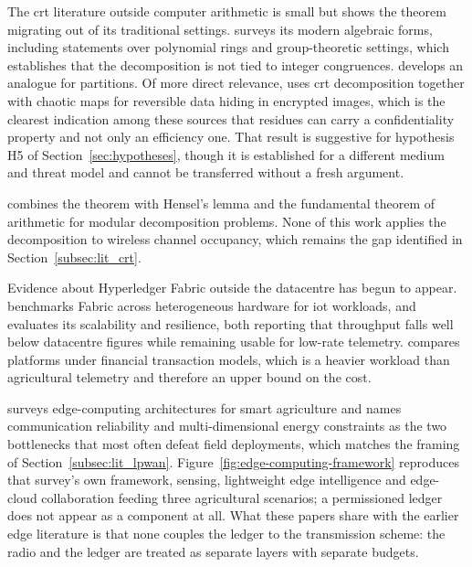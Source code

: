 \label{subsec:lit_crt_extended}

The \gls{crt} literature outside computer arithmetic is small but shows the
theorem migrating out of its traditional settings.
\textcite{luo2023researchapplication} surveys its modern algebraic forms,
including statements over polynomial rings and group-theoretic settings, which
establishes that the decomposition is not tied to integer congruences.
\textcite{seethalakshmi2023chineseremainder} develops an analogue for
partitions. Of more direct relevance,
\textcite{yavuz2025reversibledata} uses \gls{crt} decomposition together with
chaotic maps for reversible data hiding in encrypted images, which is the
clearest indication among these sources that residues can carry a
confidentiality property and not only an efficiency one. That result is
suggestive for
hypothesis H5 of Section~\ref{sec:hypotheses}, though it is established for a
different medium and threat model and cannot be transferred without a fresh
argument.

\textcite{oktaviansyah2025hybridizinghensel} combines the theorem with Hensel's
lemma and the fundamental theorem of arithmetic for modular decomposition
problems. None of this work applies the decomposition to wireless channel
occupancy, which remains the gap identified in Section~\ref{subsec:lit_crt}.

\label{subsec:lit_edge_extended}

Evidence about Hyperledger Fabric outside the datacentre has begun to appear.
\textcite{zulkarnain2025performancebenchmarking} benchmarks Fabric across
heterogeneous hardware for \gls{iot} workloads, and
\textcite{pebriyanti2025evaluationscalability} evaluates its scalability and
resilience, both reporting that throughput falls well below datacentre figures
while remaining usable for low-rate telemetry.
\textcite{kwadzode2025performancecomparison} compares platforms under financial
transaction models, which is a heavier workload than agricultural telemetry and
therefore an upper bound on the cost.

\textcite{gong2025edge} surveys edge-computing architectures for smart
agriculture and names communication reliability and multi-dimensional energy
constraints as the two bottlenecks that most often defeat field deployments,
which matches the framing of Section~\ref{subsec:lit_lpwan}. Figure~\ref{fig:edge-computing-framework}
reproduces that survey's own framework, sensing, lightweight edge
intelligence and edge-cloud collaboration feeding three agricultural
scenarios; a permissioned ledger does not appear as a component at all. What
these papers share with the earlier edge literature is that none couples the
ledger to the transmission scheme: the radio and the ledger are treated as
separate layers with separate budgets.

